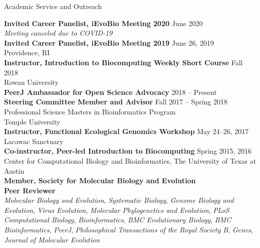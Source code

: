 \documentclass{resume} %
\begin{document}
\vspace*{0.5cm}

\vspace*{0.5cm}
\begin{rSection}{Academic Service and Outreach}
\vspace*{0.25cm}

\textbf{Invited Career Panelist, iEvoBio Meeting 2020} \hfill June 2020 \\ \emph{Meeting canceled due to COVID-19} \\


\textbf{Invited Career Panelist, iEvoBio Meeting 2019} \hfill June 26, 2019 \\ Providence, RI \\

\textbf{Instructor, Introduction to Biocomputing Weekly Short Course} \hfill Fall 2018 \\ Rowan University \\

\textbf{PeerJ Ambassador for Open Science Advocacy} \hfill 2018 -- Present \\

\textbf{Steering Committee Member and Advisor} \hfill Fall 2017 -- Spring 2018 \\ Professional Science Masters in Bioinformatics Program \\ Temple University \\

\textbf{Instructor, Functional Ecological Genomics Workshop} \hfill May 24--26, 2017 \\ Lacawac Sanctuary \\

\textbf{Co-instructor, Peer-led Introduction to Biocomputing} \hfill Spring 2015, 2016 \\ Center for Computational Biology and Bioinformatics, The University of Texas at Austin \\

\textbf{Member, Society for Molecular Biology and Evolution} \\

\textbf{Peer Reviewer} \\ \emph{Molecular Biology and Evolution}, \emph{Systematic Biology}, \emph{Genome Biology and Evolution}, \emph{Virus Evolution}, \emph{Molecular Phylogenetics and Evolution}, \emph{PLoS Computational Biology}, \emph{Bioinformatics}, \emph{BMC Evolutionary Biology},  \emph{BMC Bioinformatics}, \emph{PeerJ}, \emph{Philosophical Transactions of the Royal Society B}, \emph{Genes}, \emph{Journal of Molecular Evolution}

\end{rSection}
\vspace*{0.5cm}
\end{document}

